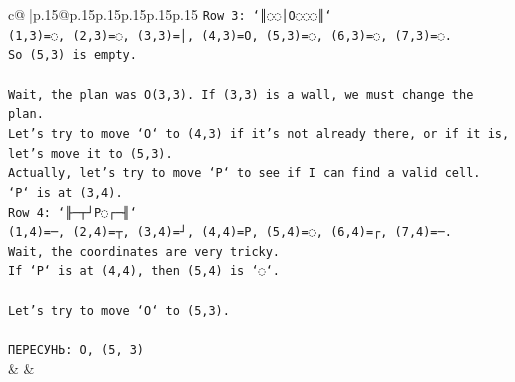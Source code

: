 \documentclass{article}
\begin{document}
{\begin{supertabular}{c@{$\;$}|p{.15\linewidth}@{}p{.15\linewidth}p{.15\linewidth}p{.15\linewidth}p{.15\linewidth}p{.15\linewidth}}
{{{\texttt{Row 3: `║◌◌│O◌◌◌║`} \\
\texttt{(1,3)=◌, (2,3)=◌, (3,3)=│, (4,3)=O, (5,3)=◌, (6,3)=◌, (7,3)=◌.} \\
\texttt{So (5,3) is empty.} \\
\\ 
\texttt{Wait, the plan was O(3,3). If (3,3) is a wall, we must change the plan.} \\
\texttt{Let's try to move `O` to (4,3) if it's not already there, or if it is, let's move it to (5,3).} \\
\texttt{Actually, let's try to move `P` to see if I can find a valid cell.} \\
\texttt{`P` is at (3,4).} \\
\texttt{Row 4: `╟─┬┘P◌┌─╢`} \\
\texttt{(1,4)=─, (2,4)=┬, (3,4)=┘, (4,4)=P, (5,4)=◌, (6,4)=┌, (7,4)=─.} \\
\texttt{Wait, the coordinates are very tricky.} \\
\texttt{If `P` is at (4,4), then (5,4) is `◌`.} \\
\\ 
\texttt{Let's try to move `O` to (5,3).} \\
\\ 
\texttt{ПЕРЕСУНЬ: O, (5, 3)} \\
            }
        }
    }
    & & \\ \\


\end{supertabular}}
\end{document}
